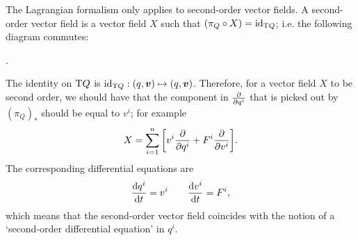 The Lagrangian formalism only applies to second-order vector fields. A second-order vector field is a vector field \(X\) such that \((\pi_Q \circ X) = \mathrm{id}_{\mathrm{T}Q}\); i.e. the following diagram commutes: \cite{Abraham1978}
\begin{center}
   .
\end{center}
The identity on \(\mathrm{T}Q\) is \(\mathrm{id}_{\tbundle{Q}}: (q, \vec{v}) \mapsto (q, \vec{v})\). Therefore, for a vector field \(X\) to be second order, we should have that the component in \(\pdv{}{q^i}\) that is picked out by \((\pi_Q)_*\) should be equal to \(v^i\); for example
\begin{equation}
     X = \sum_{i=1}^n \qty[v^i \pdv{q^i} + F^i\pdv{v^i}].
\end{equation}
The corresponding differential equations are
\begin{equation}
     \dv{q^i}{t} = v^i \qquad \dv{v^i}{t} = F^i,
\end{equation}
which means that the second-order vector field coincides with the notion of a `second-order differential equation' in \(q^i\).

